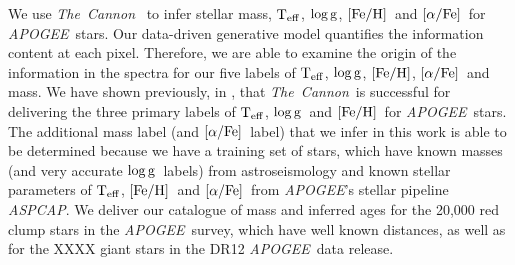 \documentclass[12pt, preprint]{aastex}
\newcommand{\project}[1]{\textsl{#1}}
\newcommand{\tc}{\project{The~Cannon}}
\newcommand{\apogee}{\project{APOGEE}}
\newcommand{\aspcap}{\project{ASPCAP}}
\newcommand{\teff}{\mbox{$\rm T_{eff}$}}
\newcommand{\feh}{\mbox{$\rm [Fe/H]$}}
\newcommand{\alphafe}{\mbox{$\rm [\alpha/Fe]$}}
\newcommand{\logg}{\mbox{$\rm \log g$}}
\begin{document}
We use \tc\  \citep{Ness2015} to infer stellar mass, \teff, \logg, \feh\ and \alphafe\ for \apogee\ stars.  Our data-driven generative model quantifies the information content at each pixel. Therefore, we are able to examine the origin of the information in the spectra for our five labels of \teff, \logg, \feh, \alphafe\ and mass. We have shown previously, in  \citet{Ness2015},  that \tc\ is successful for delivering the three primary labels of \teff, \logg\ and \feh\ for \apogee\ stars. The additional mass label (and \alphafe\ label) that we infer in this work is able to be determined because we have a training set of stars, which have known masses (and very accurate \logg\ labels) from astroseismology and known stellar parameters of \teff, \feh\ and \alphafe\ from \apogee's stellar pipeline \aspcap. We deliver our catalogue of mass and inferred ages for the 20,000 red clump stars in the \apogee\ survey, which have well known distances, as well as for the XXXX giant stars in the DR12 \apogee\ data release.










\end{document}
